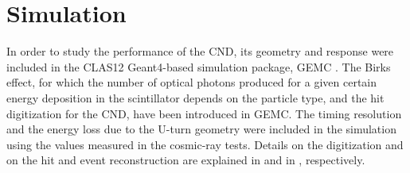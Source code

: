 \section{Simulation}
In order to study the performance of the CND, its geometry and response were included in the CLAS12 Geant4-based simulation package, GEMC \cite{sim-nim}. The Birks effect, for which the number of optical photons produced for a given certain energy deposition in the scintillator depends on the particle type, and the hit digitization for the CND, have been introduced in GEMC.
The timing resolution and the energy loss due to the U-turn geometry were included in the simulation using the values measured in the cosmic-ray tests.
Details on the digitization and on the hit and event reconstruction are explained in \cite{sim-nim} and in \cite{recon-nim}, respectively.


